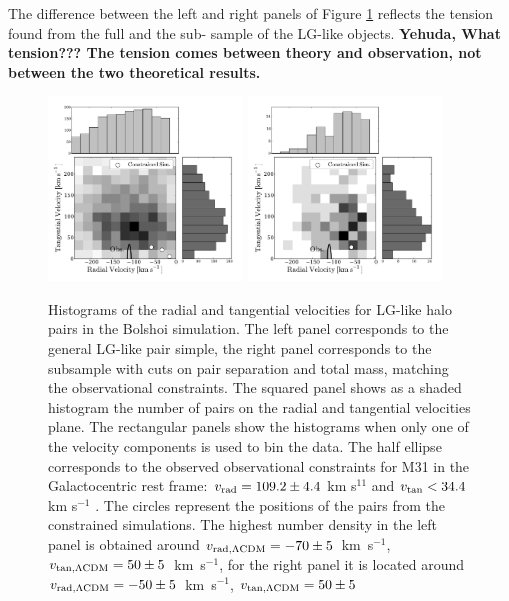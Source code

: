 \documentclass{emulateapj}
\newcommand{\kms}{\,km~s$^{-1}$}
\begin{document}
The difference between the left and right panels of Figure \ref{fig:rt} reflects  the tension found from the full and the sub- sample of the LG-like objects. {\bf Yehuda, What tension??? The tension comes between theory and observation, not between the two theoretical results.}%




\begin{figure}
\begin{center}
\includegraphics[keepaspectratio=true,width=0.46\textwidth]{./figures/test_rt_BDM.pdf}
\includegraphics[keepaspectratio=true,width=0.46\textwidth]{./figures/test_rt_BDM_narrow.pdf}
\caption{Histograms of the radial and tangential velocities for LG-like halo pairs in the Bolshoi simulation. The left panel corresponds to the general LG-like pair simple, the right panel corresponds to the subsample with cuts on pair separation and total mass, matching the observational constraints. The squared panel shows as a shaded histogram the number of pairs on the radial and tangential velocities plane. The rectangular panels show the histograms when only one of the velocity components is used to bin the data. The half ellipse corresponds to the observed observational constraints for M31 in the Galactocentric rest frame: $v_{\rm rad}=109.2\pm 4.4$ km s$^{11}$ and $v_{\rm tan}< 34.4$ km s$^{-1}$ \citep{vanderMarel12}. The circles represent the positions of the pairs from the constrained simulations. The highest number density in the left panel is obtained around $v_{\rm rad,\Lambda CDM} = -70\pm5$ \kms, $v_{\rm tan,\Lambda CDM} = 50\pm5$ \kms, for the right panel it is located around $v_{\rm rad,\Lambda CDM} = -50\pm5$ \kms, $v_{\rm tan,\Lambda CDM} = 50\pm5$ }
\label{fig:rt}
\end{center}

\end{figure}
\end{document}
